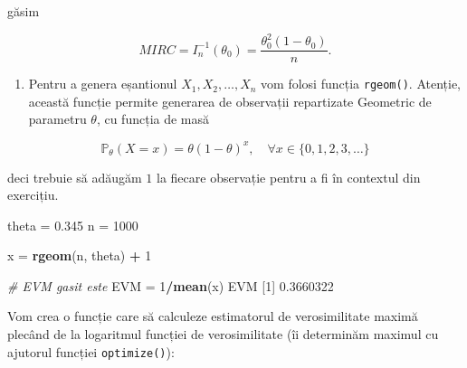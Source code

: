 \documentclass[]{article}
\newenvironment{Shaded}{\begin{snugshade}}{\end{snugshade}}
\newcommand{\CommentTok}[1]{\textcolor[rgb]{0.56,0.35,0.01}{\textit{#1}}}
\newcommand{\DecValTok}[1]{\textcolor[rgb]{0.00,0.00,0.81}{#1}}
\newcommand{\FloatTok}[1]{\textcolor[rgb]{0.00,0.00,0.81}{#1}}
\newcommand{\KeywordTok}[1]{\textcolor[rgb]{0.13,0.29,0.53}{\textbf{#1}}}
\newcommand{\NormalTok}[1]{#1}
\newcommand{\OperatorTok}[1]{\textcolor[rgb]{0.81,0.36,0.00}{\textbf{#1}}}
\newcommand{\StringTok}[1]{\textcolor[rgb]{0.31,0.60,0.02}{#1}}
\providecommand{\tightlist}{%
  \setlength{\itemsep}{0pt}\setlength{\parskip}{0pt}}
\begin{document}
găsim

\[
  MIRC = I_n^{-1}(\theta_0) = \frac{\theta_0^2(1-\theta_0)}{n}.
\]

\begin{enumerate}
\def\labelenumi{\alph{enumi})}
\setcounter{enumi}{6}
\tightlist
\item
  Pentru a genera eșantionul \(X_1, X_2, \ldots, X_n\) vom folosi
  funcția \texttt{rgeom()}. Atenție, această funcție permite generarea
  de observații repartizate Geometric de parametru \(\theta\), cu
  funcția de masă
\end{enumerate}

\[
 \mathbb{P}_{\theta}(X = x) = \theta (1-\theta)^{x}, \quad \forall x\in\{0,1,2,3,\ldots\}  
\]

deci trebuie să adăugăm \(1\) la fiecare observație pentru a fi în
contextul din exercițiu.

\begin{Shaded}
\begin{Highlighting}[]
\NormalTok{theta =}\StringTok{ }\FloatTok{0.345}
\NormalTok{n =}\StringTok{ }\DecValTok{1000}

\NormalTok{x =}\StringTok{ }\KeywordTok{rgeom}\NormalTok{(n, theta) }\OperatorTok{+}\StringTok{ }\DecValTok{1}

\CommentTok{# EVM gasit este }
\NormalTok{EVM =}\StringTok{ }\DecValTok{1}\OperatorTok{/}\KeywordTok{mean}\NormalTok{(x)}
\NormalTok{EVM}
\NormalTok{[}\DecValTok{1}\NormalTok{] }\FloatTok{0.3660322}
\end{Highlighting}
\end{Shaded}

Vom crea o funcție care să calculeze estimatorul de verosimilitate
maximă plecând de la logaritmul funcției de verosimilitate (îi
determinăm maximul cu ajutorul funcției \texttt{optimize()}):
\end{document}
